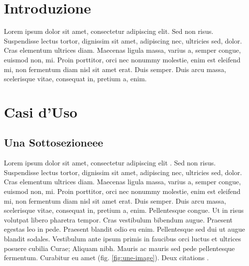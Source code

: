 \section{Introduzione}
\label{sec:introduzione}

Lorem ipsum dolor sit amet, consectetur adipiscing elit. Sed non risus. Suspendisse lectus tortor, dignissim sit amet, adipiscing nec, ultricies sed, dolor. Cras elementum ultrices diam. Maecenas ligula massa, varius a, semper congue, euismod non, mi. Proin porttitor, orci nec nonummy molestie, enim est eleifend mi, non fermentum diam nisl sit amet erat. Duis semper. Duis arcu massa, scelerisque vitae, consequat in, pretium a, enim.

\section{Casi d'Uso}
\label{sec:casiduso}

\subsection{Una Sottosezioneee}
Lorem ipsum dolor sit amet, consectetur adipiscing elit \cite{Roque2012,Roque2012b,Roque2012c,Roque2012d}. Sed non risus. Suspendisse lectus tortor, dignissim sit amet, adipiscing nec, ultricies sed, dolor. Cras elementum ultrices diam. Maecenas ligula massa, varius a, semper congue, euismod non, mi. Proin porttitor, orci nec nonummy molestie, enim est eleifend mi, non fermentum diam nisl sit amet erat. Duis semper. Duis arcu massa, scelerisque vitae, consequat in, pretium a, enim. Pellentesque congue. Ut in risus volutpat libero pharetra tempor. Cras vestibulum bibendum augue. Praesent egestas leo in pede. Praesent blandit odio eu enim. Pellentesque sed dui ut augue blandit sodales. Vestibulum ante ipsum primis in faucibus orci luctus et ultrices posuere cubilia Curae; Aliquam nibh. Mauris ac mauris sed pede pellentesque fermentum. Curabitur eu amet (fig. \ref{fig:une-image}). Deux citations \cite{Arapoglou2011,Roque2013c}.



